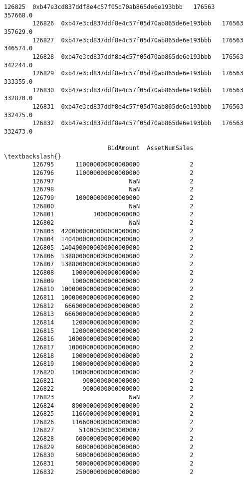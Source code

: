 \documentclass[11pt]{article}
\begin{document}
\begin{Verbatim}[commandchars=\\\{\}]
        126825  0xb47e3cd837ddf8e4c57f05d70ab865de6e193bbb   176563       357668.0   
        126826  0xb47e3cd837ddf8e4c57f05d70ab865de6e193bbb   176563       357629.0   
        126827  0xb47e3cd837ddf8e4c57f05d70ab865de6e193bbb   176563       346574.0   
        126828  0xb47e3cd837ddf8e4c57f05d70ab865de6e193bbb   176563       342244.0   
        126829  0xb47e3cd837ddf8e4c57f05d70ab865de6e193bbb   176563       333355.0   
        126830  0xb47e3cd837ddf8e4c57f05d70ab865de6e193bbb   176563       332870.0   
        126831  0xb47e3cd837ddf8e4c57f05d70ab865de6e193bbb   176563       332475.0   
        126832  0xb47e3cd837ddf8e4c57f05d70ab865de6e193bbb   176563       332473.0   
        
                             BidAmount  AssetNumSales  \textbackslash{}
        126795      110000000000000000              2   
        126796      110000000000000000              2   
        126797                     NaN              2   
        126798                     NaN              2   
        126799      100000000000000000              2   
        126800                     NaN              2   
        126801           1000000000000              2   
        126802                     NaN              2   
        126803  4200000000000000000000              2   
        126804  1404000000000000000000              2   
        126805  1404000000000000000000              2   
        126806  1388000000000000000000              2   
        126807  1388000000000000000000              2   
        126808     1000000000000000000              2   
        126809     1000000000000000000              2   
        126810  1000000000000000000000              2   
        126811  1000000000000000000000              2   
        126812   666000000000000000000              2   
        126813   666000000000000000000              2   
        126814     1200000000000000000              2   
        126815     1200000000000000000              2   
        126816    10000000000000000000              2   
        126817    10000000000000000000              2   
        126818     1000000000000000000              2   
        126819     1000000000000000000              2   
        126820     1000000000000000000              2   
        126821        9000000000000000              2   
        126822        9000000000000000              2   
        126823                     NaN              2   
        126824     8000000000000000000              2   
        126825     1166000000000000001              2   
        126826     1166000000000000000              2   
        126827       51000500003000007              2   
        126828      600000000000000000              2   
        126829      600000000000000000              2   
        126830      500000000000000000              2   
        126831      500000000000000000              2   
        126832      250000000000000000              2   
        

\end{Verbatim}
\end{document}
